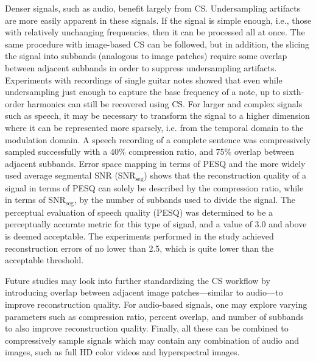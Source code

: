 Denser signals, such as audio, benefit largely from CS. Undersampling artifacts are more easily apparent in these signals. If the signal is simple enough, i.e., those with relatively unchanging frequencies, then it can be processed all at once. The same procedure with image-based CS can be followed, but in addition, the slicing the signal into subbands (analogous to image patches) require some overlap between adjacent subbands in order to suppress undersampling artifacts. Experiments with recordings of single guitar notes showed that even while undersampling just enough to capture the base frequency of a note, up to sixth-order harmonics can still be recovered using CS. For larger and complex signals such as speech, it may be necessary to transform the signal to a higher dimension where it can be represented more sparsely, i.e. from the temporal domain to the modulation domain. A speech recording of a complete sentence was compressively sampled successfully with a 40\% compression ratio, and 75\% overlap between adjacent subbands. Error space mapping in terms of PESQ and the more widely used average segmental SNR (SNR$_\mathrm{seg}$) shows that the reconstruction quality of a signal in terms of PESQ can solely be described by the compression ratio, while in terms of SNR$_\mathrm{seg}$, by the number of subbands used to divide the signal. The perceptual evaluation of speech quality (PESQ) was determined to be a perceptually accurate metric for this type of signal, and a value of 3.0 and above is deemed acceptable. The experiments performed in the study achieved reconstruction errors of no lower than 2.5, which is quite lower than the acceptable threshold.

Future studies may look into further standardizing the CS workflow by introducing overlap between adjacent image patches---similar to audio---to improve reconstruction quality. For audio-based signals, one may explore varying parameters such as compression ratio, percent overlap, and number of subbands to also improve reconstruction quality. Finally, all these can be combined to compressively sample signals which may contain any combination of audio and images, such as full HD color videos and hyperspectral images.